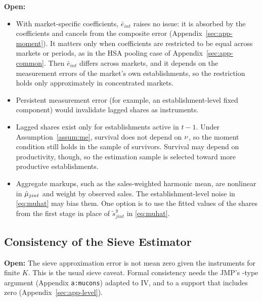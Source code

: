 \textbf{Open:}
\begin{itemize}
	\item With market-specific coefficients, $\bar{e}_{int}$ raises no issue: it is absorbed by the coefficients and cancels from the composite error (Appendix~\ref{sec:app-moment}). It matters only when coefficients are restricted to be equal across markets or periods, as in the HSA pooling case of Appendix~\ref{sec:app-common}. Then $\bar{e}_{int}$ differs across markets, and it depends on the measurement errors of the market's own establishments, so the restriction holds only approximately in concentrated markets.
	\item Persistent measurement error (for example, an establishment-level fixed component) would invalidate lagged shares as instruments.
	\item Lagged shares exist only for establishments active in $t-1$. Under Assumption~\ref{assum:me}, survival does not depend on $\nu$, so the moment condition still holds in the sample of survivors. Survival may depend on productivity, though, so the estimation sample is selected toward more productive establishments.
	\item Aggregate markups, such as the sales-weighted harmonic mean, are nonlinear in $\hat{\mu}_{jint}$ and weight by observed sales. The establishment-level noise in \eqref{eq:muhat} may bias them. One option is to use the fitted values of the shares from the first stage in place of $\tilde{s}^y_{jint}$ in \eqref{eq:muhat}.
\end{itemize}

\subsection{Consistency of the Sieve Estimator}\label{sec:app-sieve}

\textbf{Open:} The sieve approximation error is not mean zero given the instruments for finite $K$.
This is the usual sieve caveat.
Formal consistency needs the JMP's \textcite{Newey97}-type argument (Appendix \texttt{a:mucons}) adapted to IV, and to a support that includes zero (Appendix~\ref{sec:app-level}).



